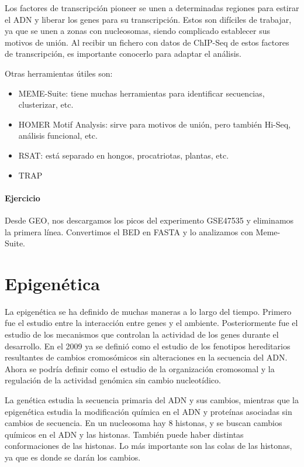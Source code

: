 Los factores de transcripción pioneer se unen a determinadas regiones para estirar el ADN y liberar los genes para su transcripción. Estos son difíciles de trabajar, ya que se unen a zonas con nucleosomas, siendo complicado establecer sus motivos de unión. Al recibir un fichero con datos de ChIP-Seq de estos factores de transcripción, es importante conocerlo para adaptar el análisis. 

Otras herramientas útiles son:
\begin{itemize}
\item MEME-Suite: tiene muchas herramientas para identificar secuencias, clusterizar, etc.
\item HOMER Motif Analysis: sirve para motivos de unión, pero también Hi-Seq, análisis funcional, etc.
\item RSAT: está separado en hongos, procatriotas, plantas, etc.
\item TRAP
\end{itemize}

\subsubsection{Ejercicio}
Desde GEO, nos descargamos los picos del experimento GSE47535 y eliminamos la primera línea. Convertimos el BED en FASTA y lo analizamos con Meme-Suite. 


\chapter{Epigenética}
La epigenética se ha definido de muchas maneras a lo largo del tiempo. Primero fue el estudio entre la interacción entre genes y el ambiente. Posteriormente fue el estudio de los mecanismos que controlan la actividad de los genes durante el desarrollo. En el 2009 ya se definió como el estudio de los fenotipos hereditarios resultantes de cambios cromosómicos sin alteraciones en la secuencia del ADN. Ahora se podría definir como el estudio de la organización cromosomal y la regulación de la actividad genómica sin cambio nucleotídico. 

La genética estudia la secuencia primaria del ADN y sus cambios, mientras que la epigenética estudia la modificación química en el ADN y proteínas asociadas sin cambios de secuencia. En un nucleosoma hay 8 histonas, y se buscan cambios químicos en el ADN y las histonas. También puede haber distintas conformaciones de las histonas. Lo más importante son las colas de las histonas, ya que es donde se darán los cambios. 

